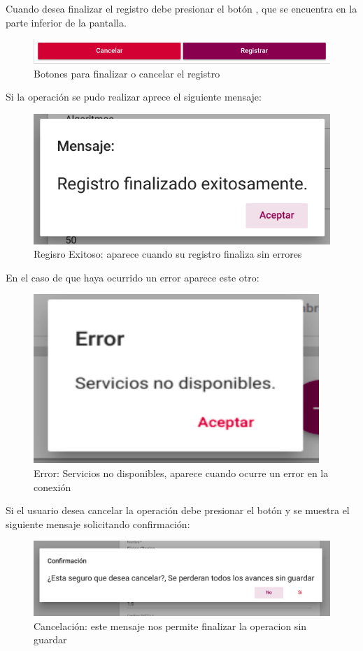 Cuando desea finalizar el registro debe presionar el botón , que se encuentra en la parte inferior de la pantalla.\\
\begin{figure}[H]
    \centering
    \hypertarget{registrarBtnR}{\includegraphics[width=0.7\linewidth]{images/GUA/registrarBtn}}
    \caption{Botones para finalizar o cancelar el registro}
    \label{registrarBtnR}
\end{figure}
Si la operación se pudo realizar aprece el siguiente mensaje:\\
\begin{figure}[H]
    \centering
    \hypertarget{exito}{\includegraphics[width=0.7\linewidth]{images/GUA/exito}}
    \caption{Regisro Exitoso: aparece cuando su registro finaliza sin errores}
    \label{exito}
\end{figure}
En el caso de que haya ocurrido un error aparece este otro:\\
\begin{figure}[H]
    \centering
    \hypertarget{errorR}{\includegraphics[width=0.7\linewidth]{images/GUA/error}}
    \caption{Error: Servicios no disponibles, aparece cuando ocurre un error en la conexión}
    \label{errorR}
\end{figure}
Si el usuario desea cancelar la operación debe presionar el botón  y se muestra el siguiente mensaje solicitando confirmación:\\
\begin{figure}[H]
    \centering
    \hypertarget{cancelarR}{\includegraphics[width=0.7\linewidth]{images/GUA/cancelar}}
    \caption{Cancelación: este mensaje nos permite finalizar la operacion sin guardar}
    \label{cancelarR}
\end{figure}
\newpage
